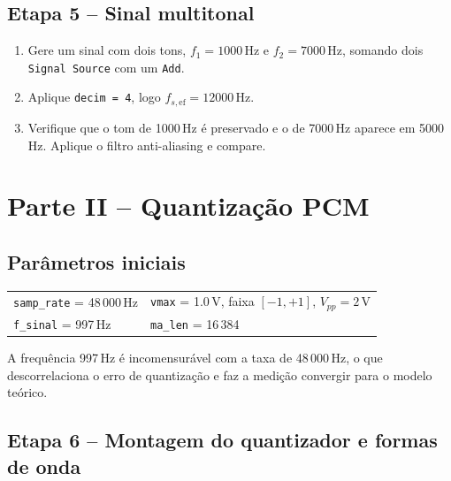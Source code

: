 \documentclass[11pt,a4paper]{article}
\begin{document}
\subsection*{Etapa 5 -- Sinal multitonal}

\begin{instrucao}
\begin{enumerate}[label=\arabic*.]
  \item Gere um sinal com dois tons, $f_1 = 1000$\,Hz e $f_2 = 7000$\,Hz,
    somando dois \texttt{Signal Source} com um \texttt{Add}.
  \item Aplique \texttt{decim = 4}, logo $f_{s,\text{ef}} = 12000$\,Hz.
  \item Verifique que o tom de 1000\,Hz é preservado e o de 7000\,Hz
    aparece em 5000\,Hz. Aplique o filtro anti-aliasing e compare.
\end{enumerate}
\end{instrucao}

\section{Parte II -- Quantização PCM}

\subsection*{Parâmetros iniciais}

\begin{center}
\begin{tabular}{l l}
  \texttt{samp\_rate} = 48\,000\,Hz & \texttt{vmax} = 1.0\,V, faixa $[-1,+1]$, $V_{pp}=2$\,V \\
  \texttt{f\_sinal} = 997\,Hz & \texttt{ma\_len} = 16\,384 \\
\end{tabular}
\end{center}

A frequência 997\,Hz é incomensurável com a taxa de 48\,000\,Hz, o que
descorrelaciona o erro de quantização e faz a medição convergir para o
modelo teórico.

\subsection*{Etapa 6 -- Montagem do quantizador e formas de onda}
\end{document}
